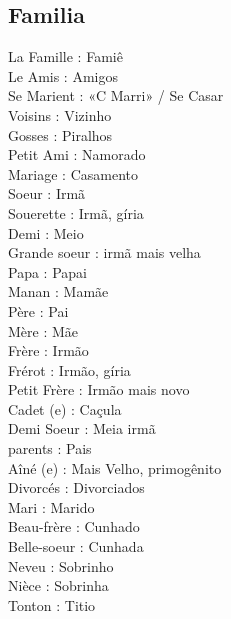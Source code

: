 \documentclass{article}
\begin{document}
    \subsection{Familia}
        La     Famille         : Famiê\\
        Le     Amis            : Amigos\\
        Se     Marient         : «C Marri» / Se Casar\\
               Voisins         : Vizinho\\
               Gosses          : Piralhos\\
        Petit  Ami             : Namorado\\
               Mariage         : Casamento\\
               Soeur           : Irmã\\
               Souerette       : Irmã,       gíria\\
               Demi            : Meio\\
        Grande soeur           : irmã mais velha\\
               Papa            : Papai\\
               Manan           : Mamãe\\
               Père            : Pai\\
               Mère            : Mãe\\
               Frère           : Irmão\\
               Frérot          : Irmão,      gíria\\
        Petit  Frère           : Irmão mais novo\\
        Cadet  (e)             : Caçula\\
        Demi   Soeur           : Meia irmã\\
               parents         : Pais\\
        Aîné   (e)             : Mais Velho, primogênito\\
               Divorcés        : Divorciados\\
               Mari            : Marido\\
               Beau-frère      : Cunhado\\
               Belle-soeur     : Cunhada\\
               Neveu           : Sobrinho\\
               Nièce           : Sobrinha\\
               Tonton          : Titio\\
\end{document}
